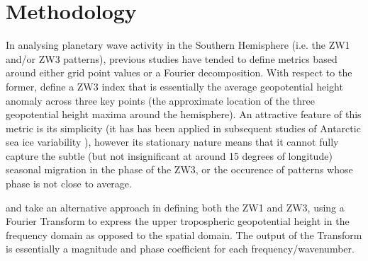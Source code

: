 \section{Methodology}

In analysing planetary wave activity in the Southern Hemisphere (i.e. the ZW1 and/or ZW3 patterns), previous studies have tended to define metrics based around either grid point values or a Fourier decomposition. With respect to the former, \citet{Raphael2004} define a ZW3 index that is essentially the average geopotential height anomaly across three key points (the approximate location of the three geopotential height maxima around the hemisphere). An attractive feature of this metric is its simplicity (it has has been applied in subsequent studies of Antarctic sea ice variability \citep{Raphael2007,Raphael2014}), however its stationary nature means that it cannot fully capture the subtle (but not insignificant at around 15 degrees of longitude) seasonal migration in the phase of the ZW3, or the occurence of patterns whose phase is not close to average.

\citet{Hobbs2007} and \citet{Hobbs2010} take an alternative approach in defining both the ZW1 and ZW3, using a Fourier Transform to express the upper tropospheric geopotential height in the frequency domain as opposed to the spatial domain. The output of the Transform is essentially a magnitude and phase coefficient for each frequency/wavenumber. 
